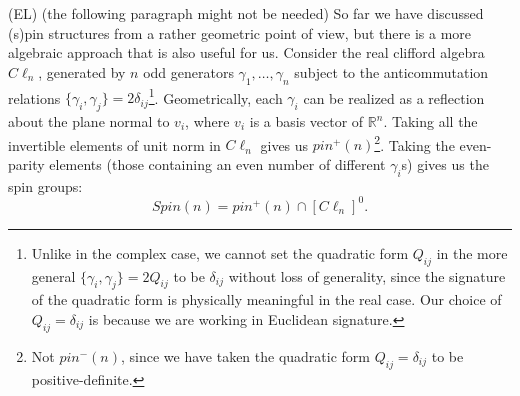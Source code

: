 \documentclass[12pt,a4paper]{article}
\newcommand\be            {\begin{equation}}
\newcommand\ee            {\end{equation}}
\newcommand{\ethan}[1]{{\color{amethyst}\footnotesize{(EL) #1}}}
\begin{document}
\ethan{(the following paragraph might not be needed)}
So far we have discussed (s)pin structures from a rather geometric point of view, but there is a more algebraic approach that is also useful for us. Consider the real clifford algebra $C\ell_n$, generated by $n$ odd generators $\gamma_1,\dots,\gamma_n$ subject to the anticommutation relations $\{\gamma_i,\gamma_j\} = 2\delta_{ij}$\footnote{Unlike in the complex case, we cannot set the quadratic form $Q_{ij}$ in the more general $\{\gamma_i,\gamma_j\} = 2Q_{ij}$ to be $\delta_{ij}$ without loss of generality, since the signature of the quadratic form is physically meaningful in the real case. Our choice of $Q_{ij} = \delta_{ij}$ is because we are working in Euclidean signature.}. Geometrically, each $\gamma_i$ can be realized as a reflection about the plane normal to $v_i$, where $v_i$ is a basis vector of $\mathbb{R}^n$. Taking all the invertible elements of unit norm in $C\ell_n$ gives us $pin^+(n)$\footnote{Not $pin^-(n)$, since we have taken the quadratic form $Q_{ij} = \delta_{ij}$ to be positive-definite.}. Taking the even-parity elements (those containing an even number of different $\gamma_i$s) gives us the spin groups:
\be Spin(n) = pin^+(n) \cap [C\ell_n]^0.\ee
\end{document}
